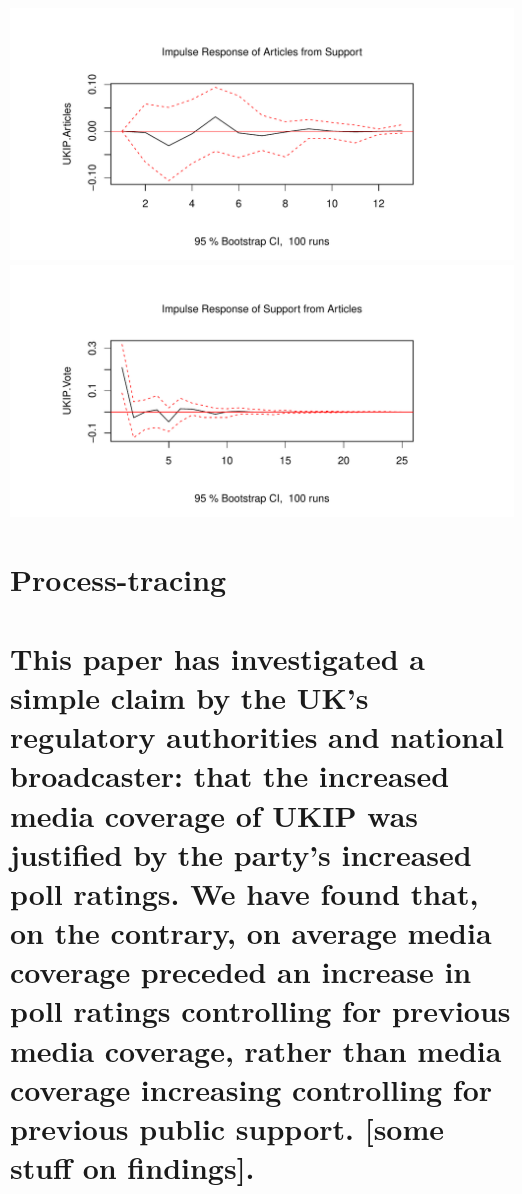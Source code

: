 \documentclass[12pt,article]{article}
\begin{document}
\includegraphics{ukip_media_files/figure-latex/unnamed-chunk-6-1.pdf}
\includegraphics{ukip_media_files/figure-latex/unnamed-chunk-6-2.pdf}

\section{Process-tracing}\label{process-tracing}

\section{This paper has investigated a simple claim by the UK's
regulatory authorities and national broadcaster: that the increased
media coverage of UKIP was justified by the party's increased poll
ratings. We have found that, on the contrary, on average media coverage
preceded an increase in poll ratings controlling for previous media
coverage, rather than media coverage increasing controlling for previous
public support. {[}some stuff on
findings{]}.}\label{this-paper-has-investigated-a-simple-claim-by-the-uks-regulatory-authorities-and-national-broadcaster-that-the-increased-media-coverage-of-ukip-was-justified-by-the-partys-increased-poll-ratings.-we-have-found-that-on-the-contrary-on-average-media-coverage-preceded-an-increase-in-poll-ratings-controlling-for-previous-media-coverage-rather-than-media-coverage-increasing-controlling-for-previous-public-support.-some-stuff-on-findings.}
\end{document}
